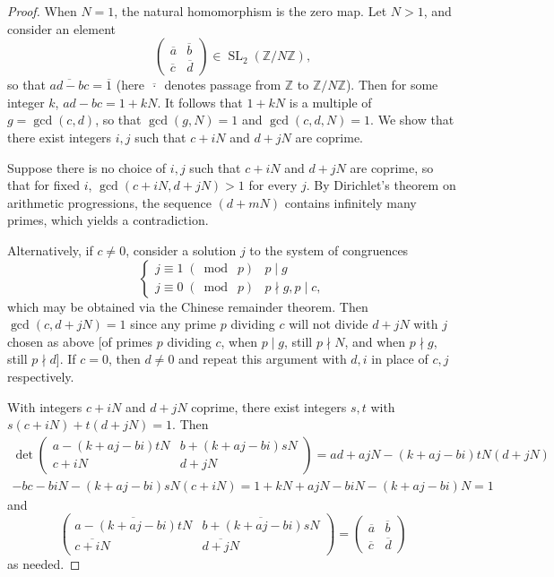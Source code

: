 \documentclass[10pt,leqno]{article}
\theoremstyle{plain}
\theoremstyle{definition}
\numberwithin{equation}{section}
\numberwithin{lem}{section}
\DeclareMathOperator{\SL}{SL}
\newcommand{\smod}[1]{\;(\bmod\; #1)}
\begin{document}
\begin{proof}
    When $N = 1$, the natural homomorphism is the zero map. Let $N>1$, and consider an element \[\begin{pmatrix}
        \overline a & \overline b \\ \overline c & \overline d
    \end{pmatrix}\in \SL_2(\mathbb{Z}/N\mathbb{Z}),\] so that $\overline{ad-bc} = \overline 1$ (here $\overline{\,\cdot\,}$ denotes passage from $\mathbb{Z}$ to $\mathbb{Z}/N\mathbb{Z}$). Then for some integer $k$, $ad-bc = 1+kN$. It follows that $1+kN$ is a multiple of $g = \gcd(c,d)$, so that $\gcd(g,N)=1$ and $\gcd(c,d,N)=1$. We show that there exist integers $i,j$ such that $c+iN$ and $d+jN$ are coprime.
    
    Suppose there is no choice of $i,j$ such that $c+iN$ and $d+jN$ are coprime, so that for fixed $i$, $\gcd(c+iN,d+jN)>1$ for every $j$. By Dirichlet's theorem on arithmetic progressions, the sequence $(d+mN)$ contains infinitely many primes, which yields a contradiction.
    
    Alternatively, if $c\neq 0$, consider a solution $j$ to the system of congruences 
    \[\begin{cases}
        j\equiv 1\smod{p} & p\mid g\\
        j\equiv 0\smod{p} & p\nmid g, p\mid c,
    \end{cases}\] which may be obtained via the Chinese remainder theorem. Then $\gcd(c,d+jN) = 1$ since any prime $p$ dividing $c$ will not divide $d+jN$ with $j$ chosen as above [of primes $p$ dividing $c$, when $p\mid g$, still $p\nmid N$, and when $p\nmid g$, still $p\nmid d$]. If $c = 0$, then $d\neq 0$ and repeat this argument with $d,i$ in place of $c,j$ respectively.

    With integers $c+iN$ and $d+jN$ coprime, there exist integers $s,t$ with $s(c+iN) + t(d+jN) = 1$. Then \begin{multline*}
        \det\begin{pmatrix}
            a-(k+aj-bi)tN & b+(k+aj-bi)sN \\ c+iN & d+jN
        \end{pmatrix} = ad+ajN-(k+aj-bi)tN(d+jN)\\-bc-biN-(k+aj-bi)sN(c+iN) = 1+kN+ajN-biN-(k+aj-bi)N = 1
    \end{multline*} and 
    \[\begin{pmatrix}
        \overline{a-(k+aj-bi)tN} & \overline{b+(k+aj-bi)sN} \\ \overline{c+iN} & \overline{d+jN}
    \end{pmatrix} = \begin{pmatrix}
        \overline a & \overline b \\ \overline c & \overline d
    \end{pmatrix}\] as needed.
\end{proof}
\end{document}
